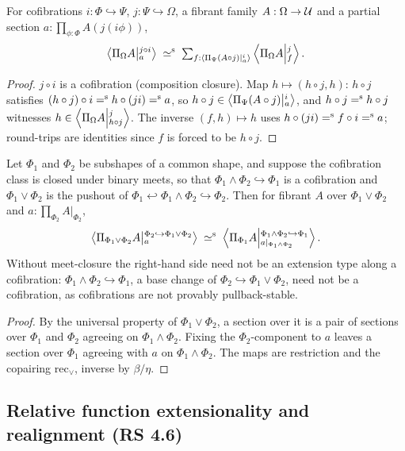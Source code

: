 \begin{lemma}\label{lem:rs44}
	For cofibrations $i:\Phi\hookrightarrow\Psi$, $j:\Psi\hookrightarrow\Omega$,
	a fibrant family $A:\Omega\to\UU$ and a partial section
	$a:\prod_{\phi:\Phi}A(j(i\phi))$,
	\[
		\Ext{j\circ i}{\Pi_\Omega A}{a}\;\siso\;\textstyle\sum_{f:\Ext{i}{\Pi_\Psi(A\circ j)}{a}}\Ext{j}{\Pi_\Omega A}{f}.
	\]
\end{lemma}
\begin{proof}
	$j\circ i$ is a cofibration (composition closure). Map $h\mapsto(h\circ j,h)$:
	$h\circ j$ satisfies $(h\circ j)\circ i \seq h\circ(ji)\seq a$, so
	$h\circ j\in\Ext{i}{\Pi_\Psi(A\circ j)}{a}$, and $h\circ j\seq h\circ j$ witnesses
	$h\in\Ext{j}{\Pi_\Omega A}{h\circ j}$. The inverse $(f,h)\mapsto h$ uses
	$h\circ(ji) \seq f\circ i\seq a$; round-trips are identities since $f$ is forced to
	be $h\circ j$.
\end{proof}

\begin{lemma}\label{lem:rs45}
	Let $\Phi_1$ and $\Phi_2$ be subshapes of a common shape, and suppose the
	cofibration class is closed under binary meets, so that
	$\Phi_1\wedge\Phi_2\hookrightarrow\Phi_1$ is a cofibration and $\Phi_1\vee\Phi_2$ is the
	pushout of $\Phi_1\hookleftarrow\Phi_1\wedge\Phi_2\hookrightarrow\Phi_2$. Then for
	fibrant $A$ over $\Phi_1\vee\Phi_2$ and $a:\prod_{\Phi_2} A|_{\Phi_2}$,
	\[
		\Ext{\Phi_2\hookrightarrow\Phi_1\vee\Phi_2}{\Pi_{\Phi_1\vee\Phi_2}A}{a}\;\siso\;\Ext{\Phi_1\wedge\Phi_2\hookrightarrow\Phi_1}{\Pi_{\Phi_1} A}{a|_{\Phi_1\wedge\Phi_2}}.
	\]
	Without meet-closure the right-hand side need not be an extension type
	along a cofibration: $\Phi_1\wedge\Phi_2\hookrightarrow\Phi_1$, a base change of
	$\Phi_2\hookrightarrow\Phi_1\vee\Phi_2$, need not be a cofibration, as cofibrations are not provably pullback-stable.
\end{lemma}
\begin{proof}
	By the universal property of $\Phi_1\vee\Phi_2$, a section over it is a pair of
	sections over $\Phi_1$ and $\Phi_2$ agreeing on $\Phi_1\wedge\Phi_2$. Fixing the
	$\Phi_2$-component to $a$ leaves a section over $\Phi_1$ agreeing with $a$ on
	$\Phi_1\wedge\Phi_2$. The maps are restriction and the copairing
	$\mathrm{rec}_\vee$, inverse by $\beta/\eta$.
\end{proof}

\subsection{Relative function extensionality and realignment (RS 4.6)}

